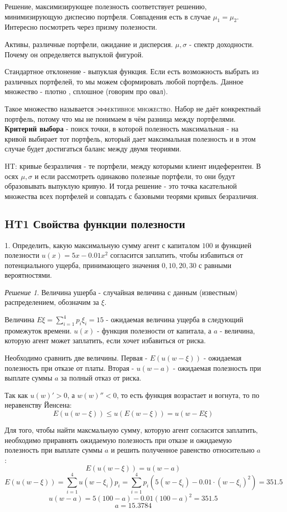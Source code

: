 \documentclass[%
12pt, %
final, %
oneside, %
onecolumn, %
centertags]{article} %
\theoremstyle{plain}
\theoremstyle{definition}
\theoremstyle{remark}
\newtheorem{solution}{Решение}
\begin{document}
Решение, максимизирующее полезность соответствует решению, минимизирующую диспесию портфеля. Совпадения есть в случае $\mu_1 = \mu_2$. Интересно посмотреть через призму полезности.

Активы, различные портфели, ожидание и дисперсия. $\mu,\sigma$ - спектр доходности. Почему он определяется выпуклой фигурой.

Стандартное отклонение - выпуклая функция. Если есть возможность выбрать из различных портфелей, то мы можем сформировать любой портфель. Данное множество - плотно , сплошное (говорим про овал). 

Такое множество называется \textsc{эффективное множество}. Набор не даёт конкректный портфель, потому что мы не понимаем в чём разница между портфелями. \textbf{Критерий выбора} - поиск точки, в которой полезность максимальная - на кривой выбирает тот портфель, который дает максимальная полезность и в этом случае будет достигаться баланс между двумя теориями.

\textsc{HT}: кривые безразличия - те портфели, между которыми клиент индеферентен. В осях $\mu,\sigma$ и если рассмотреть одинаково полезные портфели, то они будут образовывать выпуклую кривую. И тогда решение - это точка касательной множества всех портфелей и совпадать с базовыми теорями кривых безразличия.

\newpage
\subsection{HT1 Свойства функции полезности}

1. Определить, какую максимальную сумму агент с капиталом $100$ и функцией полезности $u(x) = 5x - 0.01x^2$ согласится заплатить, чтобы избавиться от потенциального ущерба, принимающего значения $0,10,20,30$ с равными вероятностями.

\begin{solution}
	Величина ушерба - случайная величина с данным (известным) распределением, обозначим за $\xi$.

	Величина $E\xi = \sum\limits_{i=1}^4 p_i\xi_i = 15$ - ожидаемая величина ущерба в следующий промежуток времени. $u(x)$ - функция полезности от капитала, а $a$ - величина, которую агент может заплатить, если хочет избавиться от риска.

	Необходимо сравнить две величины. Первая - $E(u(w-\xi))$ - ожидаемая полезность при отказе от платы. Вторая - $u(w-a)$ - ожидаемая полезность при выплате суммы $a$ за полный отказ от риска.

	Так как $u(w)'>0$, а $w(w)''<0$, то есть функция возрастает и вогнута, то по неравенству Йенсена:
	$$E(u(w-\xi)) \leq u(E(w-\xi)) = u(w - E\xi)$$

	Для того, чтобы найти максмальную сумму, которую агент согласится заплатить, необходимо приравнять ожидаемую полезность при отказе и ожидаемую полезность при выплате суммы $a$ и решить полученное равенство относительно $a$:
	$$E(u(w-\xi)) = u(w - a)$$
	$$E(u(w-\xi)) = \sum\limits_{i=1}^4 u(w-\xi_i)p_i = \sum\limits_{i=1}^4 p_i (5(w-\xi_i)-0.01\cdot (w-\xi_i)^2) = 351.5$$
	$$u(w - a) = 5 (100-a) - 0.01(100-a)^2 = 351.5$$
	$$a = 15.3784$$
\end{solution}
\end{document}
